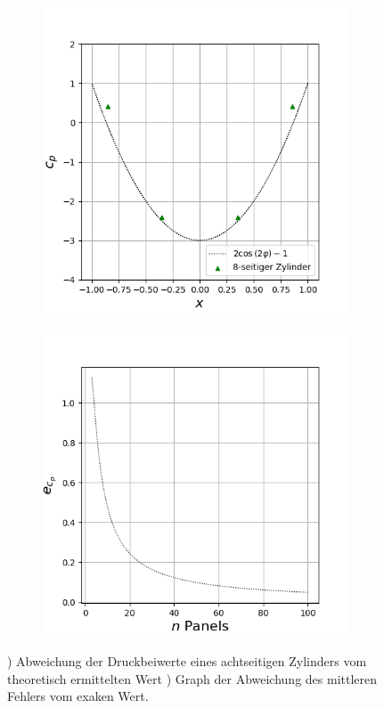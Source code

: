 \begin{figure}[ht]
  \centering
  \begin{subfigure}[b]{0.5\linewidth}
    \centering\includegraphics[scale=0.6]{figures/theoretical.png} 
    \caption{\label{fig:theoreticalcylinder}}
  \end{subfigure}%
  \begin{subfigure}[b]{0.5\linewidth}
    \centering\includegraphics[scale=0.6]{figures/absoluteerror.png} 
    \caption{\label{fig:absoluteerror}}
  \end{subfigure}
  \caption{) Abweichung der Druckbeiwerte eines achtseitigen Zylinders vom theoretisch ermittelten Wert ) Graph der Abweichung des mittleren Fehlers vom exaken Wert.}
\end{figure}
